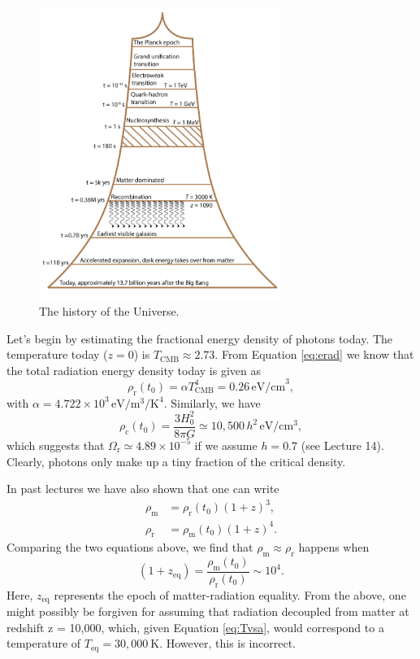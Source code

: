 \documentclass[a4paper,12pt]{article}
\theoremstyle{remark}
\newcommand{\mrm}[1]{\mathrm{#1}}
\renewcommand{\=}[1]{\stackrel{#1}{=}} %
\theoremstyle{plain}
\theoremstyle{definition}
\begin{document}
\begin{figure}[t]
\begin{center}
    \includegraphics*[angle=0,width=0.70\textwidth]{img/history_of_time_rot.png}
    \caption[The history of the Universe]{The history of the Universe.}
\label{fig:hot}
\end{center}
\end{figure}

Let's begin by estimating the fractional energy density of photons today. The temperature today ($z = 0$) is $T_\mrm{CMB} \approx 2.73$. From Equation \ref{eq:erad} we know that the total radiation energy density today is given as
\begin{equation}
\rho_\mrm{r}(t_0) = \alpha T_\mrm{CMB}^4 = 0.26 \,\mrm{eV/cm}^3,
\end{equation}
with $\alpha = 4.722 \times 10^{3}\,\mrm{eV}/\mrm{m}^3/\mrm{K}^4$. Similarly, we have 
\begin{equation}
\rho _\mrm{c} (t_0)  = \frac{3H_0^2}{8\pi G} \simeq 10,500 \, h^{2}\,\mrm{eV}/\mrm{cm}^3,
\end{equation}
which suggests that $\Omega_\mrm{r} \simeq 4.89 \times 10^{-5}$ if we assume $h = 0.7$ (see Lecture 14). Clearly, photons only make up a tiny fraction of the critical density. 

In past lectures we have also shown that one can write
\begin{align}
\rho _\mrm{m} &= \rho_\mrm{r}(t_0)(1+z)^3, \\
\rho _\mrm{r} &= \rho _\mrm{m}(t_0)(1+z)^4.
\end{align}
Comparing the two equations above, we find that $\rho_\mrm{m} \approx \rho _\mrm{r}$ happens when 
\begin{equation}
(1+z_\mrm{eq}) = \frac{\rho_\mrm{m} (t_0)}{\rho_\mrm{r}(t_0)} \sim 10^4.
\end{equation}
Here, $z_\mrm{eq}$ represents the epoch of matter-radiation equality. From the above, one might possibly be forgiven for assuming that radiation decoupled from matter at redshift z = 10,000, which, given Equation \ref{eq:Tvsa}, would correspond to a temperature of $T_\mrm{eq} = 30,000 \:\mrm{K}$.  However, this is incorrect.
\end{document}
